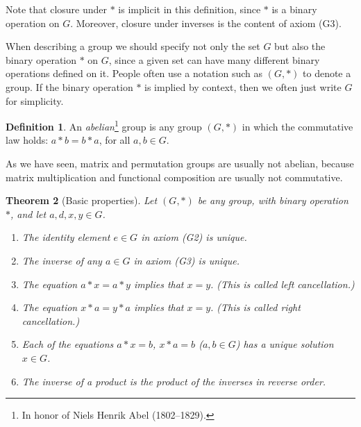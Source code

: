 \documentclass[11pt]{article}
\newtheorem{thm}{Theorem}[section]
\theoremstyle{definition}
\newtheorem{defn}[thm]{Definition}
\begin{document}
Note that closure under $*$ is implicit in this definition, since $*$
is a binary operation on $G$. Moreover, closure under inverses is the
content of axiom (G3).


When describing a group we should specify not only the set $G$ but
also the binary operation $*$ on $G$, since a given set can have many
different binary operations defined on it. People often use a notation
such as $(G,*)$ to denote a group. If the binary operation $*$ is
implied by context, then we often just write $G$ for simplicity.


\begin{defn}
An {\em abelian}\footnote{In honor of Niels Henrik Abel
  (1802--1829).} group is any group $(G,*)$ in which the commutative
law holds: $a*b=b*a$, for all $a,b\in G$.
\end{defn}

As we have seen, matrix and permutation groups are usually not
abelian, because matrix multiplication and functional composition are
usually not commutative. 


\begin{thm}[Basic properties]\label{gpprop} 
Let $(G,*)$ be any group, with binary operation $*$, and let $a,d,x,y
\in G$.
\begin{enumerate}
\item The identity element $e \in G$ in axiom {\rm(G2)} is unique.

\item The inverse of any $a \in G$ in axiom {\rm(G3)} is unique.

\item The equation $a*x=a*y$ implies that
  $x=y$.  (This is called {\em left cancellation}.)

\item The equation $x*a=y*a$ implies that
  $x=y$.  (This is called {\em right cancellation}.)

\item Each of the equations $a*x=b$, $x*a = b$ ($a,b\in G$) has a
  unique solution $x \in G$.

\item{} The inverse of a product is the
  product of the inverses in reverse order.
\end{enumerate}
\end{thm}
\end{document}
